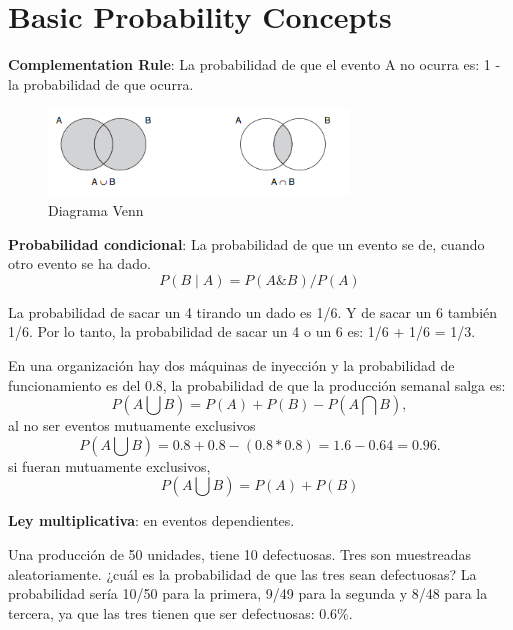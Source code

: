 \documentclass[oneside]{book}
\begin{document}
\section{Basic Probability Concepts}

\textbf{Complementation Rule}: La probabilidad de que el evento A no ocurra es: 1 - la probabilidad de que ocurra. 

\begin{figure}[ht!]
	\centering
	\includegraphics[width=80mm]{imagenes/DiagramaVenn.png}
	\caption{Diagrama Venn}
	\label{fig:DiagramaVenn}
\end{figure}

\textbf{Probabilidad condicional}: La probabilidad de que un evento se de, cuando otro evento se ha dado. \begin{equation} P(B\mid A) = P(A \& B)/P(A) \end{equation}

La probabilidad de sacar un 4 tirando un dado es 1/6. Y de sacar un 6 también 1/6. Por lo tanto, la probabilidad de sacar un 4 o un 6 es: 1/6 + 1/6 = 1/3.

En una organización hay dos máquinas de inyección y la probabilidad de funcionamiento es del 0.8, la probabilidad de que la producción semanal salga es:  
\begin{equation} P(A \bigcup B) = P(A) + P(B) - P(A \bigcap B), \end{equation}al no ser eventos mutuamente exclusivos \begin{equation}  P(A \bigcup B) = 0.8 + 0.8 - (0.8 * 0.8) = 1.6 - 0.64 = 0.96. \end{equation} si fueran mutuamente exclusivos, \begin{equation} P(A \bigcup B) = P(A) + P(B) \end{equation}

\textbf{Ley multiplicativa}: en eventos dependientes.

Una producción de 50 unidades, tiene 10 defectuosas. Tres son muestreadas aleatoriamente. ¿cuál es la probabilidad de que las tres sean defectuosas?
La probabilidad sería 10/50 para la primera, 9/49 para la segunda y 8/48 para la tercera, ya que las tres tienen que ser defectuosas: 0.6\%.
\end{document}
